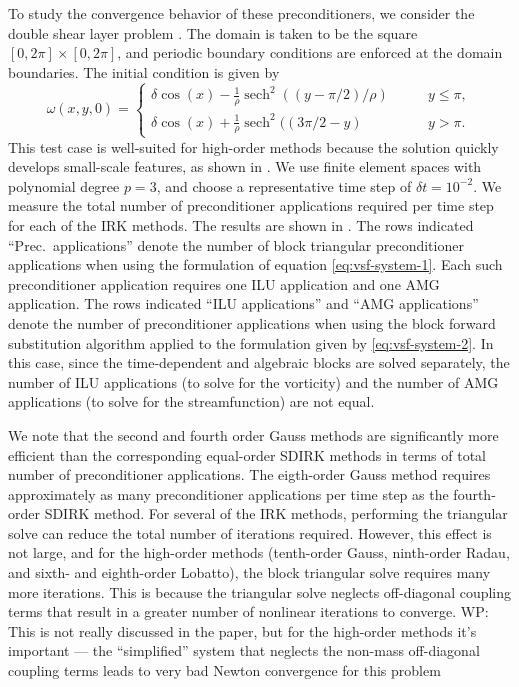 \documentclass[review]{siamart}
\begin{document}
To study the convergence behavior of these preconditioners, we consider the double shear layer problem \cite{Bell1989}.
The domain is taken to be the square $[0,2\pi] \times [0,2\pi]$, and periodic boundary conditions are enforced at the domain boundaries.
The initial condition is given by
\[
	\omega(x,y,0) = \begin{cases}
		\delta \cos(x) - \frac{1}{\rho}\operatorname{sech}^2((y-\pi/2)/\rho) \qquad & y \leq \pi, \\
		\delta \cos(x) + \frac{1}{\rho}\operatorname{sech}^2((3\pi/2 - y) \qquad & y > \pi.
	\end{cases}
\]
This test case is well-suited for high-order methods because the solution quickly develops small-scale features, as shown in .
We use finite element spaces with polynomial degree $p=3$, and choose a representative time step of $\delta t = 10^{-2}$.
We measure the total number of preconditioner applications required per time step for each of the IRK methods.
The results are shown in .
The rows indicated ``Prec.\ applications'' denote the number of block triangular preconditioner applications when using the formulation of equation \eqref{eq:vsf-system-1}.
Each such preconditioner application requires one ILU application and one AMG application.
The rows indicated ``ILU applications'' and ``AMG applications'' denote the number of preconditioner applications when using the block forward substitution algorithm applied to the formulation given by \eqref{eq:vsf-system-2}.
In this case, since the time-dependent and algebraic blocks are solved separately, the number of ILU applications (to solve for the vorticity) and the number of AMG applications (to solve for the streamfunction) are not equal.

We note that the second and fourth order Gauss methods are significantly more efficient than the corresponding equal-order SDIRK methods in terms of total number of preconditioner applications.
The eigth-order Gauss method requires approximately as many preconditioner applications per time step as the fourth-order SDIRK method.
For several of the IRK methods, performing the triangular solve can reduce the total number of iterations required.
However, this effect is not large, and for the high-order methods (tenth-order Gauss, ninth-order Radau, and sixth- and eighth-order Lobatto), the block triangular solve requires many more iterations.
{\color{red}
This is because the triangular solve neglects off-diagonal coupling terms that result in a greater number of nonlinear iterations to converge.
WP: This is not really discussed in the paper, but for the high-order methods it's important --- the ``simplified'' system that neglects the non-mass off-diagonal coupling terms leads to very bad Newton convergence for this problem}
\end{document}

